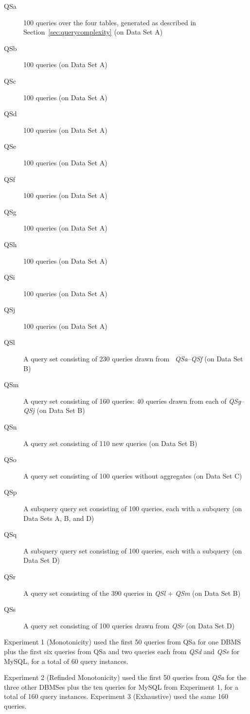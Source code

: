 \documentclass[prodmode,acmtods]{acmsmall}
\begin{document}
\begin{description}
\item[QSa] 100 queries over the four tables, generated as described in Section~\ref{sec:querycomplexity} (on Data Set A)
\item[QSb] 100 queries (on Data Set A)
\item[QSc] 100 queries (on Data Set A)
\item[QSd] 100 queries (on Data Set A)
\item[QSe] 100 queries (on Data Set A)
\item[QSf] 100 queries (on Data Set A)
\item[QSg] 100 queries (on Data Set A)
\item[QSh] 100 queries (on Data Set A)
\item[QSi] 100 queries (on Data Set A)
\item[QSj] 100 queries (on Data Set A)
\item[QSl] A query set consisting of 230 queries drawn from \hbox{\em
  QSa}--{\em QSf} (on Data Set B)
\item[QSm] A query set consisting of 160 queries: 40 queries
  drawn from each of {\em QSg}--{\em QSj} (on Data Set B)
\item[QSn] A query set consisting of 110 new queries (on Data Set B)
\item[QSo] A query set consisting of 100 queries without aggregates (on Data
  Set C)
\item[QSp] A subquery query set consisting of 100 queries, each with a subquery (on Data Sets A, B, and D)
\item[QSq] A subquery query set consisting of 100 queries, each with a subquery (on Data Set D)
\item[QSr] A query set consisting of the 390 queries in {\em QSl} + {\em QSm} (on Data Set B)
\item[QSs] A query set consisting of 100 queries drawn from {\em QSr} (on Data Set D)
\end{description}

Experiment 1 (Monotonicity) used the first 50 queries from QSa
for one DBMS plus the first six queries from QSa and two queries each from
{\em QSd} and {\em QSe} for MySQL, for a total of 60 query instances.

Experiment 2 (Refinded Monotonicity) used the first 50 queries from {\em QSa}
for the three other DBMSes plus the ten queries for MySQL from Experiment 1, for
a total of 160 query instances. Experiment 3 (Exhaustive) used the same 160 queries.
\end{document}
